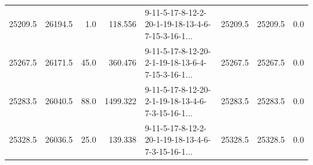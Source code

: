 \begin{tabular}{rrrrlrrr}
 25209.5 &  26194.5 &            1.0 &            118.556 &  9-11-5-17-8-12-2-20-1-19-18-13-4-6-7-15-3-16-1... &       25209.5 &         25209.5 &       0.0 \\
 25267.5 &  26171.5 &           45.0 &            360.476 &  9-11-5-17-8-12-20-2-1-19-18-13-6-4-7-15-3-16-1... &       25267.5 &         25267.5 &       0.0 \\
 25283.5 &  26040.5 &           88.0 &           1499.322 &  9-11-5-17-8-12-20-2-1-19-18-13-4-6-7-3-15-16-1... &       25283.5 &         25283.5 &       0.0 \\
 25328.5 &  26036.5 &           25.0 &            139.338 &  9-11-5-17-8-12-2-20-1-19-18-13-4-6-7-3-15-16-1... &       25328.5 &         25328.5 &       0.0 \\
\bottomrule
\end{tabular}
